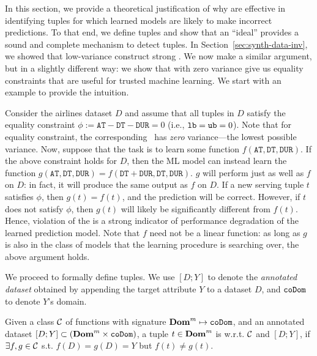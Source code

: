 
\newcommand{\arrTime}{\texttt{AT}\xspace}
\newcommand{\depTime}{\texttt{DT}\xspace}
\newcommand{\duration}{\texttt{DUR}\xspace}

 In this section, we provide a theoretical justification of why
\dis are effective in identifying tuples for which learned models are likely to
make incorrect predictions. To that end, we define \emph{\nc} tuples and show
that an ``ideal'' \di provides a sound and complete mechanism to detect \nc
tuples. In Section~\ref{sec:synth-data-inv}, we showed that low-variance \views
construct strong \dis.
We now make a similar argument, but in a slightly different way: we show that
\views with zero variance give us equality constraints that are useful for
trusted machine learning. We start with an example to provide the intuition.

\begin{example}\label{ex:one} 
	 Consider the airlines dataset $D$ and assume that all tuples in $D$
	 satisfy the equality constraint $\phi := \arrTime - \depTime - \duration = 0$
	 (i.e., ${\mathtt{lb}} = {\mathtt{ub}} = 0$). Note that for equality constraint, the corresponding
	 \view\ has {\em{zero}} variance---the lowest possible variance. Now, suppose
	 that the task is to learn some function $f(\arrTime, \depTime, \duration)$.
	 If the above constraint holds for $D$, then the ML model can instead learn
	 the function $g(\arrTime, \depTime, \duration) = f(\depTime + \duration,
	 \depTime, \duration)$. $g$ will perform just as well as $f$ on $D$: in fact,
	 it will produce the same output as $f$ on $D$. If a new serving tuple $t$
	 satisfies $\phi$, then $g(t) = f(t)$, and the prediction will be correct.
	 However, if $t$ does not satisfy $\phi$, then $g(t)$ will likely be
	 significantly different from $f(t)$. Hence, violation of the \di is a strong
	 indicator of performance degradation of the learned prediction model. Note
	 that $f$ need not be a linear function: as long as $g$ is also in the class
	 of models that the learning procedure is searching over, the above argument
	 holds.
\end{example}

We proceed to formally define \nc tuples. We use $[D;Y]$ to denote the
{\em{annotated dataset}} obtained by appending the target attribute $Y$ to a
dataset $D$, and $\mathtt{coDom}$ to denote $Y$'s domain.

\begin{definition}[\Nc\ tuple]\label{def:trustworthy}
    Given a class $\mathcal{C}$ of functions with signature $\mathbf{Dom}^m \mapsto \mathtt{coDom}$,
    and an annotated dataset $[D;Y] \subset (\mathbf{Dom}^m\times \mathtt{coDom})$,
    a tuple $t \in \mathbf{Dom}^m$ is \nc w.r.t. $\mathcal{C}$ and $[D;Y]$, if
    $\exists f, g \in \mathcal{C}$ s.t. $f(D) = g(D) = Y$ but $f(t) \neq g(t)$. 
\end{definition}

